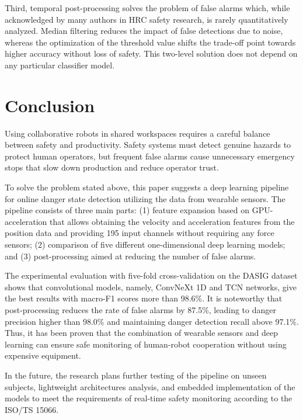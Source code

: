 \documentclass[3p,times,procedia]{elsarticle}
\begin{document}
Third, temporal post-processing solves the problem of false alarms which, while acknowledged by many authors in HRC safety research, is rarely quantitatively analyzed. Median filtering reduces the impact of false detections due to noise, whereas the optimization of the threshold value shifts the trade-off point towards higher accuracy without loss of safety. This two-level solution does not depend on any particular classifier model.
\section{Conclusion}
\label{sec:conclusion}

Using collaborative robots in shared workspaces requires a careful balance between safety and productivity. Safety systems must detect genuine hazards to protect human operators, but frequent false alarms cause unnecessary emergency stops that slow down production and reduce operator trust.

To solve the problem stated above, this paper suggests a deep learning pipeline for online danger state detection utilizing the data from wearable sensors. The pipeline consists of three main parts: (1) feature expansion based on GPU-acceleration that allows obtaining the velocity and acceleration features from the position data and providing 195 input channels without requiring any force sensors; (2) comparison of five different one-dimensional deep learning models; and (3) post-processing aimed at reducing the number of false alarms.

The experimental evaluation with five-fold cross-validation on the DASIG dataset shows that convolutional models, namely, ConvNeXt 1D and TCN networks, give the best results with macro-F1 scores more than 98.6\%. It is noteworthy that post-processing reduces the rate of false alarms by 87.5\%, leading to danger precision higher than 98.0\% and maintaining danger detection recall above 97.1\%. Thus, it has been proven that the combination of wearable sensors and deep learning can ensure safe monitoring of human-robot cooperation without using expensive equipment.

In the future, the research plans further testing of the pipeline on unseen subjects, lightweight architectures analysis, and embedded implementation of the models to meet the requirements of real-time safety monitoring according to the ISO/TS 15066.
\newpage


\end{document}
